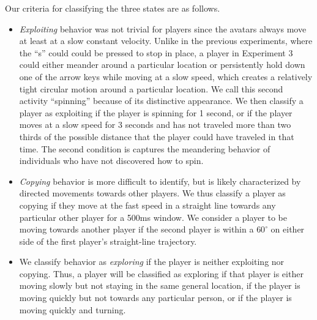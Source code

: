 \documentclass[12pt,letterpaper]{article}
\begin{document}
Our criteria for classifying the three states are as follows.
\begin{itemize}
\item \emph{Exploiting} behavior was not trivial for players since the avatars always move at least at a slow constant velocity. 
Unlike in the previous experiments, where the ``s'' could could be pressed to stop in place, a player in Experiment 3 could either meander around a particular location or persistently hold down one of the arrow keys while moving at a slow speed, which creates a relatively tight circular motion around a particular location.  
We call this second activity ``spinning'' because of its distinctive appearance.  
We then classify a player as exploiting if the player is spinning for 1 second, or if the player moves at a slow speed for 3 seconds and has not traveled more than two thirds of the possible distance that the player could have traveled in that time.
The second condition is captures the meandering behavior of individuals who have not discovered how to spin.
\item \emph{Copying} behavior is more difficult to identify, but is likely characterized by directed movements towards other players. 
We thus classify a player as copying if they move at the fast speed in a straight line towards any particular other player for a 500ms window.
We consider a player to be moving towards another player if the second player is within a $60^\circ$ on either side of the first player's straight-line trajectory.
\item We classify behavior as \emph{exploring} if the player is neither exploiting nor copying. Thus, a player will be classified as exploring if that player is either moving slowly but not staying in the same general location, if the player is moving quickly but not towards any particular person, or if the player is moving quickly and turning.
\end{itemize}
\end{document}
